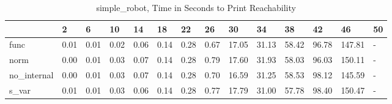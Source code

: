 \begin{table}
\caption{simple_robot, Time in Seconds to Print Reachability}
\label{simple_robot_states_time}
\begin{tabular}{llllllllllllll}
\toprule
 & 2 & 6 & 10 & 14 & 18 & 22 & 26 & 30 & 34 & 38 & 42 & 46 & 50 \\
\midrule
func & 0.01 & 0.01 & 0.02 & 0.06 & 0.14 & 0.28 & 0.67 & 17.05 & 31.13 & 58.42 & 96.78 & 147.81 & - \\
norm & 0.00 & 0.01 & 0.03 & 0.07 & 0.14 & 0.28 & 0.79 & 17.60 & 31.93 & 58.03 & 96.03 & 150.11 & - \\
no_internal & 0.00 & 0.01 & 0.03 & 0.07 & 0.14 & 0.28 & 0.70 & 16.59 & 31.25 & 58.53 & 98.12 & 145.59 & - \\
s_var & 0.01 & 0.01 & 0.03 & 0.06 & 0.14 & 0.28 & 0.77 & 17.79 & 31.00 & 57.78 & 98.40 & 150.47 & - \\
\bottomrule
\end{tabular}
\end{table}
